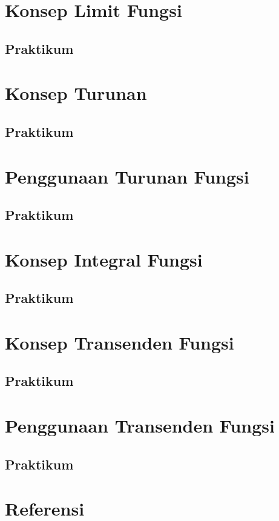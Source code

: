 \documentclass[
]{book}
\begin{document}
\chapter{Konsep Limit Fungsi}\label{Konsep_Limit_Fungsi}

\section{Praktikum}\label{praktikum-1}

\chapter{Konsep Turunan}\label{Konsep_Turunan}

\section{Praktikum}\label{praktikum-2}

\chapter{Penggunaan Turunan Fungsi}\label{Penggunaan_Turunan_Fungsi}

\section{Praktikum}\label{praktikum-3}

\chapter{Konsep Integral Fungsi}\label{Konsep_Integral_Fungsi}

\section{Praktikum}\label{praktikum-4}

\chapter{Konsep Transenden Fungsi}\label{Konsep_Transenden_Fungsi}

\section{Praktikum}\label{praktikum-5}

\chapter{Penggunaan Transenden Fungsi}\label{Penggunaan_Transenden_Fungsi}

\section{Praktikum}\label{praktikum-6}

\chapter{Referensi}\label{referensi}

  
\end{document}

